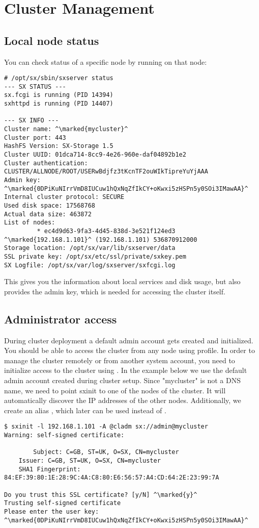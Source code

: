 \chapter{Cluster Management}

\section{Local node status}
You can check status of a specific node by running  on
that node:
\begin{lstlisting}
# /opt/sx/sbin/sxserver status
--- SX STATUS ---
sx.fcgi is running (PID 14394)
sxhttpd is running (PID 14407)

--- SX INFO ---
Cluster name: ^\marked{mycluster}^
Cluster port: 443
HashFS Version: SX-Storage 1.5
Cluster UUID: 01dca714-8cc9-4e26-960e-daf04892b1e2
Cluster authentication: CLUSTER/ALLNODE/ROOT/USERwBdjfz3tKcnTF2ouWIkTipreYuYjAAA
Admin key: ^\marked{0DPiKuNIrrVmD8IUCuw1hQxNqZfIkCY+oKwxi5zHSPn5y0SOi3IMawAA}^
Internal cluster protocol: SECURE
Used disk space: 17568768
Actual data size: 463872
List of nodes:
         * ec4d9d63-9fa3-4d45-838d-3e521f124ed3 ^\marked{192.168.1.101}^ (192.168.1.101) 536870912000
Storage location: /opt/sx/var/lib/sxserver/data
SSL private key: /opt/sx/etc/ssl/private/sxkey.pem
SX Logfile: /opt/sx/var/log/sxserver/sxfcgi.log
\end{lstlisting}
This gives you the information about local services and disk usage, but
also provides the admin key, which is needed for accessing the cluster
itself.

\section{Administrator access}
During cluster deployment a default admin account gets created
and initialized. You should be able to access the cluster from
any node using  profile. In order
to manage the cluster remotely or from another system account,
you need to initialize access to the cluster using . 
In the example below we use the default admin account created
during cluster setup. Since "mycluster" is not a DNS name, we need
to point sxinit to one of the nodes of the cluster. It will
automatically discover the IP addresses of the other nodes.
Additionally, we create an alias , which later
can be used instead of .
\begin{lstlisting}
$ sxinit -l 192.168.1.101 -A @cladm sx://admin@mycluster
Warning: self-signed certificate:

        Subject: C=GB, ST=UK, O=SX, CN=mycluster
	Issuer: C=GB, ST=UK, O=SX, CN=mycluster
	SHA1 Fingerprint: 84:EF:39:80:1E:28:9C:4A:C8:80:E6:56:57:A4:CD:64:2E:23:99:7A

Do you trust this SSL certificate? [y/N] ^\marked{y}^
Trusting self-signed certificate
Please enter the user key:
^\marked{0DPiKuNIrrVmD8IUCuw1hQxNqZfIkCY+oKwxi5zHSPn5y0SOi3IMawAA}^
\end{lstlisting}

